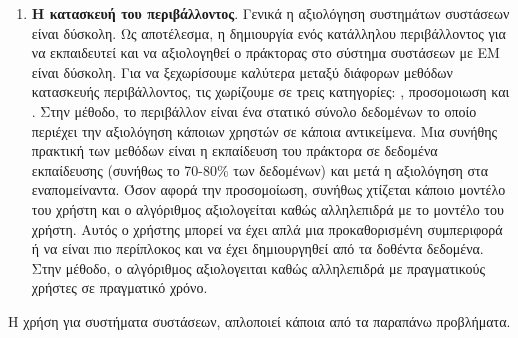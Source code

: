 \begin{enumerate}
    \item \textbf{Η κατασκευή του περιβάλλοντος}. Γενικά η αξιολόγηση συστημάτων συστάσεων είναι δύσκολη. Ως αποτέλεσμα, η δημιουργία ενός κατάλληλου περιβάλλοντος για να εκπαιδευτεί και να αξιολογηθεί ο πράκτορας στο σύστημα συστάσεων με ΕΜ είναι δύσκολη. Για να ξεχωρίσουμε καλύτερα μεταξύ διάφορων μεθόδων κατασκευής περιβάλλοντος, τις χωρίζουμε σε τρεις κατηγορίες: , προσομοιωση και . Στην  μέθοδο, το περιβάλλον είναι ένα στατικό σύνολο δεδομένων το οποίο περιέχει την αξιολόγηση κάποιων χρηστών σε κάποια αντικείμενα. Μια συνήθης πρακτική των  μεθόδων είναι η εκπαίδευση του πράκτορα σε δεδομένα εκπαίδευσης (συνήθως το 70-80\% των δεδομένων) και μετά η αξιολόγηση στα εναπομείναντα. Όσον αφορά την προσομοίωση, συνήθως χτίζεται κάποιο μοντέλο του χρήστη και ο αλγόριθμος αξιολογείται καθώς αλληλεπιδρά με το μοντέλο του χρήστη. Αυτός ο χρήστης μπορεί να έχει απλά μια προκαθορισμένη συμπεριφορά ή να είναι πιο περίπλοκος και να έχει δημιουργηθεί από τα δοθέντα δεδομένα. Στην  μέθοδο, ο αλγόριθμος αξιολογειται καθώς αλληλεπιδρά με πραγματικούς χρήστες σε πραγματικό χρόνο.
\end{enumerate}

Η χρήση  για συστήματα συστάσεων, απλοποιεί κάποια από τα παραπάνω προβλήματα.



